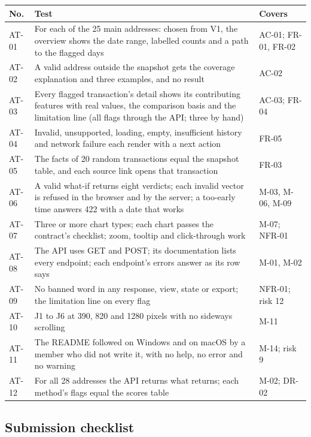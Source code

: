 {\small
\begin{longtable}{@{}L{1.1cm}L{9.6cm}L{3.4cm}@{}}
\toprule
\textbf{No.} & \textbf{Test} & \textbf{Covers} \\
\midrule
\endhead
AT-01 & For each of the 25 main addresses: chosen from V1, the overview shows the date range, labelled counts and a path to the flagged days & AC-01; FR-01, FR-02 \\
AT-02 & A valid address outside the snapshot gets the coverage explanation and three examples, and no result & AC-02 \\
AT-03 & Every flagged transaction's detail shows its contributing features with real values, the comparison basis and the limitation line (all flags through the API; three by hand) & AC-03; FR-04 \\
AT-04 & Invalid, unsupported, loading, empty, insufficient history and network failure each render with a next action & FR-05 \\
AT-05 & The facts of 20 random transactions equal the snapshot table, and each source link opens that transaction & FR-03 \\
AT-06 & A valid what-if returns eight verdicts; each invalid vector is refused in the browser and by the server; a too-early time answers 422 with a date that works & M-03, M-06, M-09 \\
AT-07 & Three or more chart types; each chart passes the contract's checklist; zoom, tooltip and click-through work & M-07; NFR-01 \\
AT-08 & The API uses GET and POST; its documentation lists every endpoint; each endpoint's errors answer as its row says & M-01, M-02 \\
AT-09 & No banned word in any response, view, state or export; the limitation line on every flag & NFR-01; risk 12 \\
AT-10 & J1 to J6 at 390, 820 and 1280 pixels with no sideways scrolling & M-11 \\
AT-11 & The README followed on Windows and on macOS by a member who did not write it, with no help, no error and no warning & M-14; risk 9 \\
AT-12 & For all 28 addresses the API returns what  returns; each method's flags equal the scores table & M-02; DR-02 \\
\bottomrule
\end{longtable}
}

\subsection{Submission checklist}
\label{sec:checklist}

